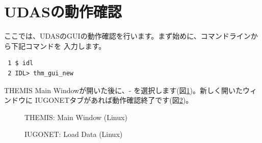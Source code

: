 \documentclass[a4j]{jbook}
\begin{document}
\section{UDASの動作確認}

ここでは、UDASのGUIの動作確認を行います。まず始めに、コマンドラインから下記コマンドを
入力します。
\begin{screen}
\begin{verbatim}
 1 $ idl
 2 IDL> thm_gui_new
\end{verbatim}
\end{screen}
THEMIS Main Windowが開いた後に、-
を選択します(図\ref{thm_gui_linux1.eps})。新しく開いたウィンドウに
IUGONETタブがあれば動作確認終了です(図\ref{thm_gui_linux2.eps})。

\begin{figure}[H]
\begin{center}
\caption{THEMIS: Main Window (Linux)}
\label{thm_gui_linux1.eps}
\end{center}
\end{figure}

\begin{figure}[H]
\begin{center}
\caption{IUGONET: Load Data (Linux)}
\label{thm_gui_linux2.eps}
\end{center}
\end{figure}
\end{document}
